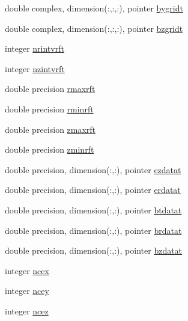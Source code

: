 \begin{DoxyCompactItemize}
\item 
double complex, dimension(\+:,\+:,\+:), pointer \mbox{\hyperlink{structdataclass_1_1fielddata_a5be2ee97690040bc191e474a8128268c}{bygridt}}
\item 
double complex, dimension(\+:,\+:,\+:), pointer \mbox{\hyperlink{structdataclass_1_1fielddata_a9624d17177a345e1bc8749b6bdb4c451}{bzgridt}}
\item 
integer \mbox{\hyperlink{structdataclass_1_1fielddata_aa5ca1fbf50c64fd3111f84c05b27a626}{nrintvrft}}
\item 
integer \mbox{\hyperlink{structdataclass_1_1fielddata_a0f84e89e0c3f2e8b8ac1b6b09b5e6b71}{nzintvrft}}
\item 
double precision \mbox{\hyperlink{structdataclass_1_1fielddata_ad3d3c49a06ccba3d74cec08ccac3ba74}{rmaxrft}}
\item 
double precision \mbox{\hyperlink{structdataclass_1_1fielddata_a50959e96924c22806be36879d08f8342}{rminrft}}
\item 
double precision \mbox{\hyperlink{structdataclass_1_1fielddata_a8302c4d489f349d54ff3fa17ae25ae4a}{zmaxrft}}
\item 
double precision \mbox{\hyperlink{structdataclass_1_1fielddata_a2f063280da3bc87a3bd10bdef7fce0f0}{zminrft}}
\item 
double precision, dimension(\+:,\+:), pointer \mbox{\hyperlink{structdataclass_1_1fielddata_a117a66a64c471555f76b60475a5eb749}{ezdatat}}
\item 
double precision, dimension(\+:,\+:), pointer \mbox{\hyperlink{structdataclass_1_1fielddata_ad0dd726b937d1856f802836eef2a022f}{erdatat}}
\item 
double precision, dimension(\+:,\+:), pointer \mbox{\hyperlink{structdataclass_1_1fielddata_a36e12caa5512ea4a766181f407257c1e}{btdatat}}
\item 
double precision, dimension(\+:,\+:), pointer \mbox{\hyperlink{structdataclass_1_1fielddata_af2e812c6f2b2202954a724f0c7f934ca}{brdatat}}
\item 
double precision, dimension(\+:,\+:), pointer \mbox{\hyperlink{structdataclass_1_1fielddata_aeff2d035d7e3b4ee7bb7efea43b160fe}{bzdatat}}
\item 
integer \mbox{\hyperlink{structdataclass_1_1fielddata_ad95160bd02ade87e93fc035a9851fb78}{ncex}}
\item 
integer \mbox{\hyperlink{structdataclass_1_1fielddata_a3d45c0760de77d30e22c5bedf5b0738b}{ncey}}
\item 
integer \mbox{\hyperlink{structdataclass_1_1fielddata_a8c35d3f6fc1a03f3bf4d5bc3dc8a90a9}{ncez}}

\end{DoxyCompactItemize}
